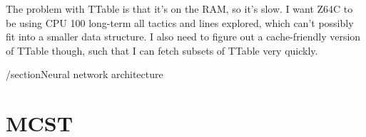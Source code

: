 The problem with TTable is that it's on the RAM, so it's slow. I want Z64C to be
using CPU 100%
long-term all tactics and lines explored, which can't possibly fit into a
smaller data structure. I also need to figure out a cache-friendly version of
TTable though, such that I can fetch subsets of TTable very quickly.


/section{Neural network architecture}
\section{\ac{MCST}}
